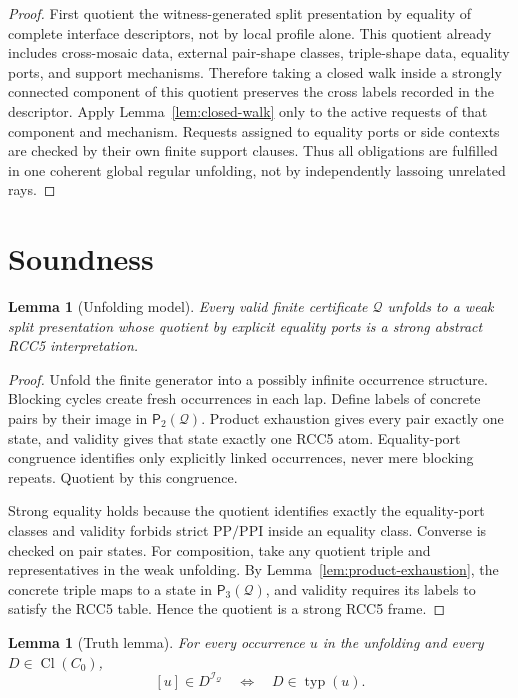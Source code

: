 \documentclass[11pt]{article}
\newtheorem{lemma}[theorem]{Lemma}
\newcommand{\Cl}{\operatorname{Cl}}
\newcommand{\typ}{\operatorname{typ}}
\newcommand{\PP}{\mathrm{PP}}
\newcommand{\PPI}{\mathrm{PPI}}
\newcommand{\I}{\mathcal I}
\newcommand{\Q}{\mathcal Q}
\newcommand{\Pairs}{\mathsf{P}_2}
\newcommand{\Triples}{\mathsf{P}_3}
\begin{document}
\begin{proof}
First quotient the witness-generated split presentation by equality of complete interface descriptors, not by local profile alone.  This quotient already includes cross-mosaic data, external pair-shape classes, triple-shape data, equality ports, and support mechanisms.  Therefore taking a closed walk inside a strongly connected component of this quotient preserves the cross labels recorded in the descriptor.  Apply Lemma~\ref{lem:closed-walk} only to the active requests of that component and mechanism.  Requests assigned to equality ports or side contexts are checked by their own finite support clauses.  Thus all obligations are fulfilled in one coherent global regular unfolding, not by independently lassoing unrelated rays.
\end{proof}

\section{Soundness}

\begin{lemma}[Unfolding model]
\label{lem:unfolding}
Every valid finite certificate $\Q$ unfolds to a weak split presentation whose quotient by explicit equality ports is a strong abstract RCC5 interpretation.
\end{lemma}

\begin{proof}
Unfold the finite generator into a possibly infinite occurrence structure.  Blocking cycles create fresh occurrences in each lap.  Define labels of concrete pairs by their image in $\Pairs(\Q)$.  Product exhaustion gives every pair exactly one state, and validity gives that state exactly one RCC5 atom.  Equality-port congruence identifies only explicitly linked occurrences, never mere blocking repeats.  Quotient by this congruence.

Strong equality holds because the quotient identifies exactly the equality-port classes and validity forbids strict $\PP/\PPI$ inside an equality class.  Converse is checked on pair states.  For composition, take any quotient triple and representatives in the weak unfolding.  By Lemma~\ref{lem:product-exhaustion}, the concrete triple maps to a state in $\Triples(\Q)$, and validity requires its labels to satisfy the RCC5 table.  Hence the quotient is a strong RCC5 frame.
\end{proof}

\begin{lemma}[Truth lemma]
\label{lem:truth}
For every occurrence $u$ in the unfolding and every $D\in\Cl(C_0)$,
\[
   [u]\in D^{\I_\Q}
   \quad\Longleftrightarrow\quad
   D\in\typ(u).
\]
\end{lemma}
\end{document}

